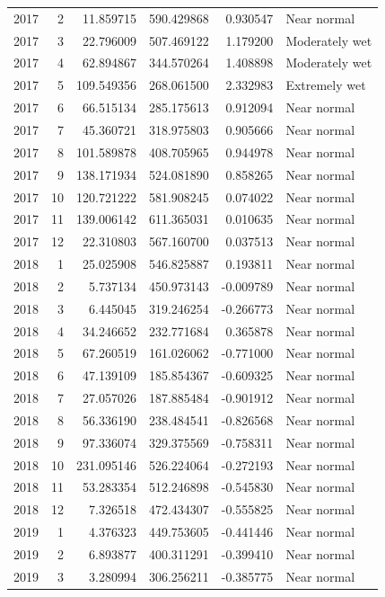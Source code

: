 \begin{tabular}{rrrrrl}
2017 & 2 & 11.859715 & 590.429868 & 0.930547 & Near normal \\
2017 & 3 & 22.796009 & 507.469122 & 1.179200 & Moderately wet \\
2017 & 4 & 62.894867 & 344.570264 & 1.408898 & Moderately wet \\
2017 & 5 & 109.549356 & 268.061500 & 2.332983 & Extremely wet \\
2017 & 6 & 66.515134 & 285.175613 & 0.912094 & Near normal \\
2017 & 7 & 45.360721 & 318.975803 & 0.905666 & Near normal \\
2017 & 8 & 101.589878 & 408.705965 & 0.944978 & Near normal \\
2017 & 9 & 138.171934 & 524.081890 & 0.858265 & Near normal \\
2017 & 10 & 120.721222 & 581.908245 & 0.074022 & Near normal \\
2017 & 11 & 139.006142 & 611.365031 & 0.010635 & Near normal \\
2017 & 12 & 22.310803 & 567.160700 & 0.037513 & Near normal \\
2018 & 1 & 25.025908 & 546.825887 & 0.193811 & Near normal \\
2018 & 2 & 5.737134 & 450.973143 & -0.009789 & Near normal \\
2018 & 3 & 6.445045 & 319.246254 & -0.266773 & Near normal \\
2018 & 4 & 34.246652 & 232.771684 & 0.365878 & Near normal \\
2018 & 5 & 67.260519 & 161.026062 & -0.771000 & Near normal \\
2018 & 6 & 47.139109 & 185.854367 & -0.609325 & Near normal \\
2018 & 7 & 27.057026 & 187.885484 & -0.901912 & Near normal \\
2018 & 8 & 56.336190 & 238.484541 & -0.826568 & Near normal \\
2018 & 9 & 97.336074 & 329.375569 & -0.758311 & Near normal \\
2018 & 10 & 231.095146 & 526.224064 & -0.272193 & Near normal \\
2018 & 11 & 53.283354 & 512.246898 & -0.545830 & Near normal \\
2018 & 12 & 7.326518 & 472.434307 & -0.555825 & Near normal \\
2019 & 1 & 4.376323 & 449.753605 & -0.441446 & Near normal \\
2019 & 2 & 6.893877 & 400.311291 & -0.399410 & Near normal \\
2019 & 3 & 3.280994 & 306.256211 & -0.385775 & Near normal \\

\end{tabular}
